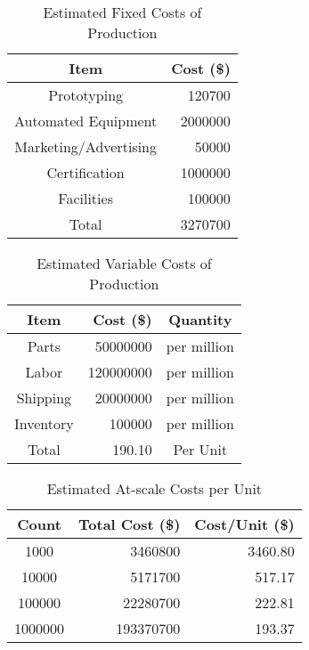 \begin{table}[htbp]
\caption{Estimated Fixed Costs of Production}
\label{tab:prod_fixed_costs}
\begin{center}
\begin{tabular}{|c|r|} \hline
Item & Cost (\$) \\ \hline\hline
Prototyping           & 120700    \\
Automated Equipment   & 2000000   \\
Marketing/Advertising & 50000     \\
Certification         & 1000000   \\
Facilities            & 100000    \\ \hline
Total                 & 3270700   \\ \hline
\end{tabular}
\end{center}
\end{table}


\begin{table}[htbp]
\caption{Estimated Variable Costs of Production}
\label{tab:prod_vari_costs}
\begin{center}
\begin{tabular}{|c|r|c|} \hline
Item & Cost (\$) & Quantity \\ \hline\hline
Parts           & 50000000    & per million \\
Labor & 120000000 & per million \\
Shipping & 20000000  & per million \\
Inventory         & 100000   & per million \\ \hline
Total                 & 190.10   & Per Unit\\ \hline
\end{tabular}
\end{center}
\end{table}


\begin{table}[htbp]
\caption{Estimated At-scale Costs per Unit}
\label{tab:prod_per_unit_costs}
\begin{center}
\begin{tabular}{|c|r|r|} \hline
Count & Total Cost (\$) & Cost/Unit (\$) \\ \hline\hline
1000  & 3460800    & 3460.80 \\
10000 & 5171700 & 517.17 \\
100000 & 22280700 & 222.81 \\
1000000 & 193370700  & 193.37 \\ \hline
\end{tabular}
\end{center}
\end{table}
